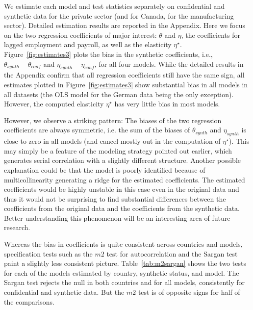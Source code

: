 We estimate each model and test statistics separately on confidential and synthetic data for the private sector (and for Canada, for the manufacturing sector). Detailed estimation results are reported in the Appendix. Here we  focus on the two regression coefficients of major interest: $\theta$ and $\eta$, the coefficients for lagged employment and payroll, as well as the elasticity $\eta^\star$. Figure~\ref{fig:estimates3} plots the bias in the synthetic coefficients, i.e., $\theta_{synth}-\theta_{conf}$ and $\eta_{synth}-\eta_{conf}$, for all four models. While the detailed results in the Appendix confirm that all regression coefficients still have the same sign, all estimates plotted in Figure~\ref{fig:estimates3} show substantial bias in all models in all datasets (the OLS model for the German data being the only exception). However, the computed elasticity $\eta^\star$ has very little bias in most models.




However, we observe a striking pattern: The biases of the two regression coefficients are always symmetric, i.e. the sum of the biases of $\theta_{synth}$ and $\eta_{synth}$ is close to zero in all models (and cancel mostly out in the computation of $\eta^\star$). 
This may simply be a feature of the modeling strategy pointed out earlier, which generates serial correlation with a slightly different structure. Another possible explanation could be that the model is poorly identified because of multicollinearity generating a ridge for the estimated coefficients. The estimated coefficients would be highly unstable in this case even in the original data and thus it would not be surprising to find substantial differences between the coefficients from the original data and the coefficients from the synthetic data. Better understanding this phenomenon will be an interesting area of future research.




Whereas the bias in coefficients is quite consistent across countries and models, specification tests such as  the $m2$ test for autocorrelation and the Sargan test paint a slightly less consistent picture. Table~\ref{tab:m2sargan} shows the two tests for each of the models estimated by country, synthetic status, and model. The Sargan test rejects the null in both countries and for all models, consistently for confidential and synthetic data. But the $m2$ test is of opposite signs for half of the comparisons. 



